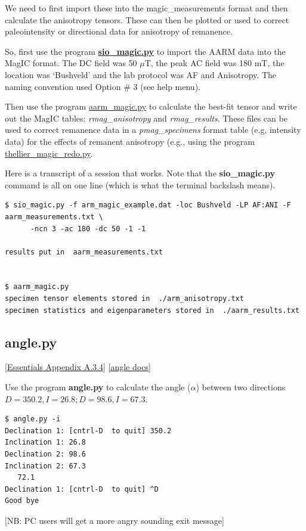 \documentclass[11pt]{book}
\begin{document}
{ We need to first import these into the magic\_measurements format and then calculate the anisotropy tensors.  These can then be plotted or used to correct paleointensity or directional data for anisotropy of remanence.

So,  first use the program \href{#sio_magic.py}{\bf sio\_magic.py}  to import the AARM data  into the MagIC format.  The DC field was 50 $\mu$T, the peak AC field was 180 mT, the location was `Bushveld' and the lab protocol was AF and Anisotropy.   The naming convention used Option \# 3 (see help menu).

Then use the program \href{#aarm_magic.py}{aarm\_magic.py}  to calculate the best-fit tensor and write out the MagIC tables: {\it rmag\_anisotropy} and {\it rmag\_results}.   These files can be used to correct remanence data in a {\it pmag\_specimens} format table (e.g, intensity data) for the effects of remanent anisotropy (e.g., using the program \href{#thellier_magic.py}{thellier\_magic\_redo.py}.

Here is a transcript of a session that works.   Note that the {\bf  sio\_magic.py}  command is all on one line (which is what the terminal backslash means).

\begin{verbatim}
$ sio_magic.py -f arm_magic_example.dat -loc Bushveld -LP AF:ANI -F aarm_measurements.txt \
      -ncn 3 -ac 180 -dc 50 -1 -1

results put in  aarm_measurements.txt


$ aarm_magic.py
specimen tensor elements stored in  ./arm_anisotropy.txt
specimen statistics and eigenparameters stored in  ./aarm_results.txt

\end{verbatim}


%
\subsection{angle.py } [\href{http://earthref.org/MAGIC/books/Tauxe/Essentials/WebBook3ap1.html#Vector_multiplication}{Essentials Appendix A.3.4}]
\href{https://github.com/PmagPy/PmagPy/blob/master/programs/angle.py}{[angle docs]}


 Use the program {\bf angle.py} to calculate the angle ($\alpha$) between two directions $D=350.2, I=26.8; D=98.6, I=67.3$.

\begin{verbatim}
$ angle.py -i
Declination 1: [cntrl-D  to quit] 350.2
Inclination 1: 26.8
Declination 2: 98.6
Inclination 2: 67.3
   72.1
Declination 1: [cntrl-D  to quit] ^D
Good bye
\end{verbatim}
 [NB: PC users will get a more angry sounding exit message]

}
\end{document}
